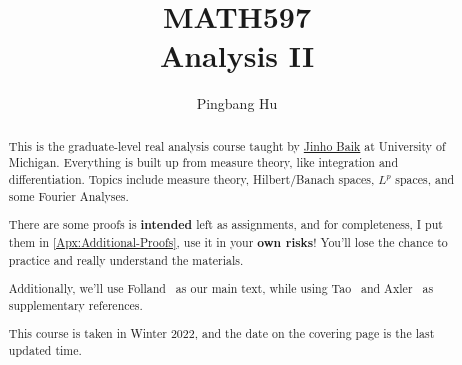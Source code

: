 \documentclass[a4paper]{report}
\author{Pingbang Hu}
\title{MATH597\\Analysis II}
\begin{document}
\maketitle

\begin{abstract}
	This is the graduate-level real analysis course taught by \href{http://www.math.lsa.umich.edu/~baik/Welcome.html}{Jinho Baik} at University of Michigan. Everything is built up from measure theory, like integration and differentiation. Topics include measure theory, Hilbert/Banach spaces, \(L^p\) spaces, and some Fourier Analyses.

	There are some proofs is \textbf{intended} left as assignments, and for completeness, I put them in \autoref{Apx:Additional-Proofs}, use it in your \textbf{own risks}! You'll lose the chance to practice and really understand the materials.

	Additionally, we'll use Folland~\cite{folland1999real} as our main text, while using Tao~\cite{tao2013introduction} and Axler~\cite{axler2019measure} as supplementary references.

	\vfill
	This course is taken in Winter 2022, and the date on the covering page is the last updated time.
\end{abstract}

\tableofcontents


\newpage
\appendix
\appendixpage{}



\newpage
\printbibliography{}
\end{document}
